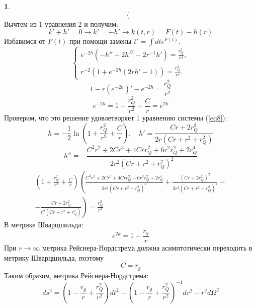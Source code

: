 \documentclass[12pt]{article}
\theoremstyle{definition}
\newtheorem{zad}{}[section]
\begin{document}
\begin{zad}
\begin{equation}
\begin{cases}
\end{cases}
\end{equation}
Вычтем из 1 уравнения 2 и получим:
\begin{equation}
    k'+h'=0\rightarrow k'=-h'\rightarrow k(t,r)=F(t)-h(r)
\end{equation}
Избавимся от $F(t)$ при помощи замены $t'=\int dt e^{F(t)}$.
\begin{equation}\label{eq8}
    \begin{cases}
    e^{-2h}(-h''+2h'^2-2r^{-1}h')=\frac{r_Q^2}{r^4},\\
    r^{-2}(1+e^{-2h}(2rh'-1))=\frac{r_Q^2}{r^4}.
    \end{cases}
\end{equation}
\begin{equation}
    1-r(e^{-2h})'-e^{-2h}=\frac{r_Q^2}{r^2}
\end{equation}
\begin{equation}
    e^{-2h}=1+\frac{r_Q^2}{r^2}+\frac{C}{r}=e^{2k}
\end{equation}
Проверим, что это решение удовлетворяет 1 уравнению системы (\ref{eq8}):
\begin{equation}
    h=-\frac{1}{2}\ln\left(1+\frac{r_Q^2}{r^2}+\frac{C}{r}\right),\quad h'=\frac{Cr+2r_Q^2}{2r(Cr+r^2+r_Q^2)}
\end{equation}
\begin{equation}
    h''=-\frac{C^2r^2+2Cr^3+4Crr_Q^2+6r^2r_Q^2+2r_Q^4}{2r^2(Cr+r^2+r_Q^2)^2}
\end{equation}
\begin{multline}
    \left(1+\frac{r_Q^2}{r^2}+\frac{C}{r}\right)\left(\frac{C^2r^2+2Cr^3+4Crr_Q^2+6r^2r_Q^2+2r_Q^4}{2r^2(Cr+r^2+r_Q^2)^2}+\frac{(Cr+2r_Q^2)^2}{2r^2(Cr+r^2+r_Q^2)^2}\right.-\\-\left.\frac{Cr+2r_Q^2}{r^2(Cr+r^2+r_Q^2)}\right)=\frac{r_Q^2}{r^4}
\end{multline}
В метрике Шварцшильда:
\begin{equation}
    e^{2k}=1-\frac{r_g}{r}
\end{equation}
При $r\rightarrow\infty$ метрика Рейснера-Нордстрема должна асимптотически переходить в метрику Шварцшильда, поэтому
\begin{equation}
    C=r_g
\end{equation}
Таким образом, метрика Рейснера-Нордстрема:
\begin{equation}
    \boxed{ds^2=\left(1-\frac{r_g}{r}+\frac{r^2_Q}{r^2}\right)dt^2-\left(1-\frac{r_g}{r}+\frac{r^2_Q}{r^2}\right)^{-1}dr^2-r^2d\Omega^2}
\end{equation}
\end{zad}
\end{document}
